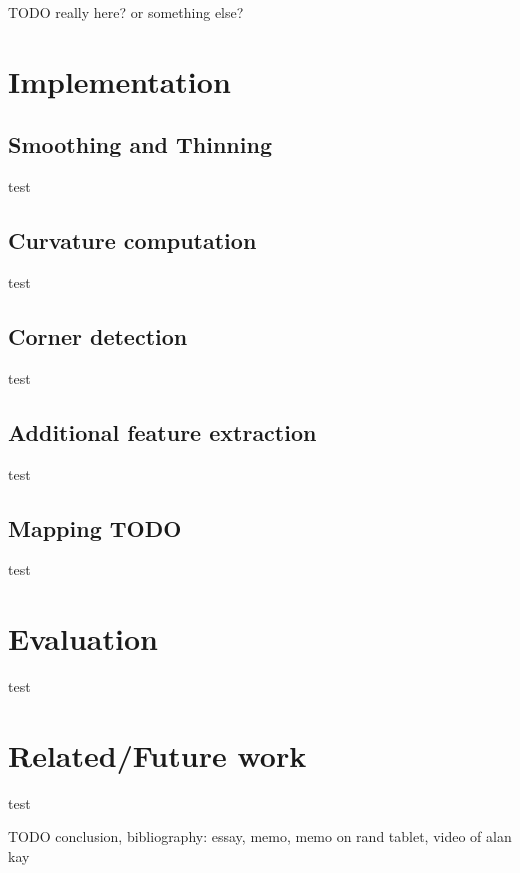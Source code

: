 \documentclass[sigconf]{acmart}
\begin{document}
TODO really here? or something else?

\section{Implementation}

\subsection{Smoothing and Thinning}

test

\subsection{Curvature computation}

test

\subsection{Corner detection}

test

\subsection{Additional feature extraction}

test

\subsection{Mapping TODO}

test

\section{Evaluation}

test

\section{Related/Future work}

test

TODO conclusion, bibliography: essay, memo, memo on rand tablet, video of alan kay
\end{document}
